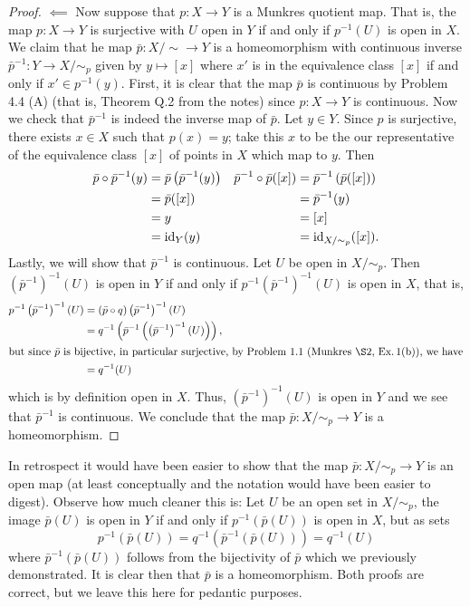 \begin{proof}
$\impliedby$ Now suppose that $p\colon X\to Y$ is a Munkres
quotient map. That is, the map $p\colon X\to Y$ is surjective
with $U$ open in $Y$ if and only if $p^{-1}(U)$ is open in
$X$. We claim that he map $\bar p\colon X/{\sim}\to Y$ is a
homeomorphism with continuous inverse $\bar p^{-1}\colon Y\to
X/{\sim_p}$ given by $y\mapsto[x]$ where $x'$ is in the equivalence
class $[x]$ if and only if $x'\in p^{-1}(y)$. First,
it is clear that the map $\bar p$ is continuous by Problem 4.4
(A) (that is, Theorem Q.2 from the notes) since $p\colon X\to Y$
is continuous. Now we check that $\bar p^{-1}$ is indeed the
inverse map of $\bar p$. Let $y\in Y$. Since $p$ is surjective,
there exists $x\in X$ such that $p(x)=y$; take this $x$ to be the
our representative of the equivalence class $[x]$ of points in
$X$ which map to $y$. Then
\begin{align*}
\bar p\circ \bar p^{-1}(y)
&=
\bar p\left(\bar p^{-1}(y)\right)
&
\bar p^{-1}\circ\bar p([x])
&=\bar p^{-1}\left(\bar p([x])\right)
\\
&=
\bar p([x])
&
&=\bar p^{-1}(y)
\\
&=y
&
&=[x]
\\
&=\operatorname{id}_Y(y)
&
&=\operatorname{id}_{X/{\sim_p}}([x]).
\end{align*}
Lastly, we will show that $\bar p^{-1}$ is continuous. Let $U$ be
open in $X/{\sim_p}$. Then $\left(\bar p^{-1}\right)^{-1}(U)$ is
open in $Y$ if and only if $p^{-1}\left(\bar
  p^{-1}\right)^{-1}(U)$ is open in $X$, that is,
\begin{align*}
p^{-1}\left(\bar p^{-1}\right)^{-1}(U)
&=\left(\bar p\circ q\right)\left(\bar p^{-1}\right)^{-1}(U)\\
&=q^{-1}\left(\bar p^{-1}\left(\left(\bar p^{-1}\right)^{-1}(U)\right)\right),\\
\shortintertext{but since $\bar p$ is bijective, in particular
  surjective, by Problem 1.1 (Munkres \S2, Ex.\,1(b)), we have}
&=q^{-1}(U)
\end{align*}
which is by definition open in $X$. Thus, $\left(\bar
  p^{-1}\right)^{-1}(U)$ is open in $Y$ and we see that
$\bar p^{-1}$ is continuous. We conclude that the map $\bar
p\colon X/{\sim_p}\to Y$ is a homeomorphism.
\end{proof}
\begin{remarks*}
In retrospect it would have been easier to show that the map
$\bar p\colon X/{\sim_p}\to Y$ is an open map (at least
conceptually and the notation would have been easier to
digest). Observe how much cleaner this is: Let $U$ be an open set
in $X/{\sim_p}$, the image $\bar p(U)$ is open in $Y$ if and only
if $p^{-1}(\bar p(U))$ is open in $X$, but as sets
\[
p^{-1}(\bar p(U))=q^{-1}\left(\bar p^{-1}\left(\bar p(U)\right)\right)=q^{-1}(U)
\]
where $\bar p^{-1}\left(\bar p(U)\right)$ follows from the
bijectivity of $\bar p$ which we previously demonstrated. It is
clear then that $\bar p$ is a homeomorphism. Both proofs are
correct, but we leave this here for pedantic purposes.
\end{remarks*}

